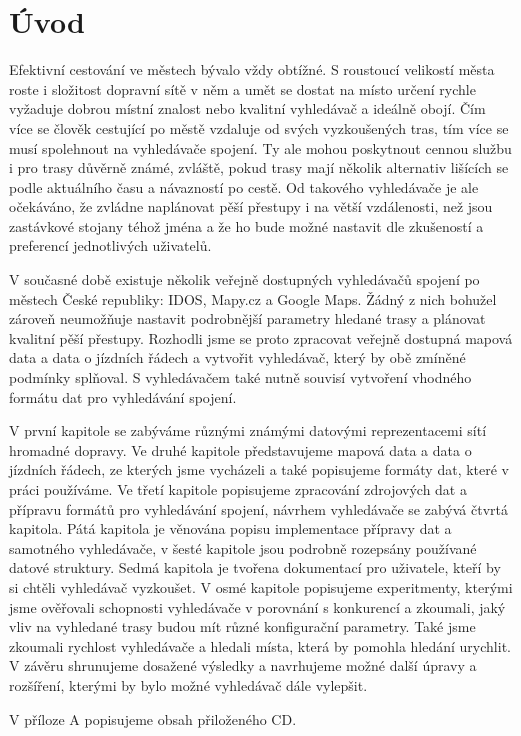 \chapter*{Úvod}

Efektivní cestování ve městech bývalo vždy obtížné. S roustoucí velikostí města
roste i složitost dopravní sítě v něm a umět se dostat na místo určení rychle
vyžaduje dobrou místní znalost nebo kvalitní vyhledávač a ideálně obojí. Čím
více se člověk cestující po městě vzdaluje od svých vyzkoušených tras, tím více
se musí spolehnout na vyhledávače spojení. Ty ale mohou poskytnout cennou službu
i pro trasy důvěrně známé, zvláště, pokud trasy mají několik alternativ lišících
se podle aktuálního času a návazností po cestě. Od takového vyhledávače je ale
očekáváno, že zvládne naplánovat pěší přestupy i na větší vzdálenosti, než jsou
zastávkové stojany téhož jména a že ho bude možné nastavit dle zkušeností a
preferencí jednotlivých uživatelů. 

V současné době existuje několik veřejně dostupných vyhledávačů spojení po
městech České republiky: IDOS, Mapy.cz a Google Maps. Žádný z nich bohužel
zároveň neumožňuje nastavit podrobnější parametry hledané trasy a plánovat
kvalitní pěší přestupy. Rozhodli jsme se proto zpracovat veřejně dostupná mapová
data a data o jízdních řádech a vytvořit vyhledávač, který by obě zmíněné
podmínky splňoval. S vyhledávačem také nutně souvisí vytvoření vhodného formátu
dat pro vyhledávání spojení.

V první kapitole se zabýváme různými známými datovými reprezentacemi sítí hromadné
dopravy. Ve druhé kapitole představujeme mapová data a data o jízdních řádech,
ze kterých jsme vycházeli a také popisujeme formáty dat, které v práci
používáme. Ve třetí kapitole popisujeme zpracování zdrojových dat a přípravu
formátů pro vyhledávání spojení, návrhem vyhledávače se zabývá čtvrtá kapitola.
Pátá kapitola je věnována popisu implementace přípravy dat a samotného
vyhledávače, v šesté kapitole jsou podrobně rozepsány používané datové
struktury. Sedmá kapitola je tvořena dokumentací pro uživatele, kteří by si
chtěli vyhledávač vyzkoušet. V osmé kapitole popisujeme experitmenty, kterými
jsme ověřovali schopnosti vyhledávače v porovnání s konkurencí a zkoumali, jaký
vliv na vyhledané trasy budou mít různé konfigurační parametry. Také jsme
zkoumali rychlost vyhledávače a hledali místa, která by pomohla hledání
urychlit. V závěru shrunujeme dosažené výsledky a navrhujeme možné další úpravy
a rozšíření, kterými by bylo možné vyhledávač dále vylepšit.

V příloze A popisujeme obsah přiloženého CD.
